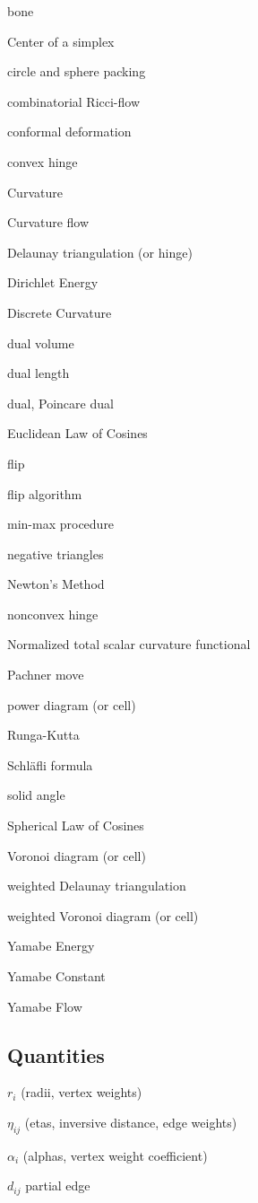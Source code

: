 \documentclass{article}
\begin{document}
bone

Center of a simplex

circle and sphere packing

combinatorial Ricci-flow

conformal deformation

convex hinge

Curvature

Curvature flow

Delaunay triangulation (or hinge)

Dirichlet Energy

Discrete Curvature

dual volume

dual length

dual, Poincare dual

Euclidean Law of Cosines

flip

flip algorithm

min-max procedure

negative triangles

Newton's Method

nonconvex hinge

Normalized total scalar curvature functional

Pachner move

power diagram (or cell)

Runga-Kutta

Schl\"{a}fli formula

solid angle

Spherical Law of Cosines

Voronoi diagram (or cell)

weighted Delaunay triangulation

weighted Voronoi diagram (or cell)

Yamabe Energy

Yamabe Constant

Yamabe Flow

\bigskip 

\subsection{Quantities}

$r_{i}$ (radii, vertex weights)

$\eta _{ij}$ (etas, inversive distance, edge weights)

$\alpha _{i}$ (alphas, vertex weight coefficient)

$d_{ij}$ partial edge
\end{document}
